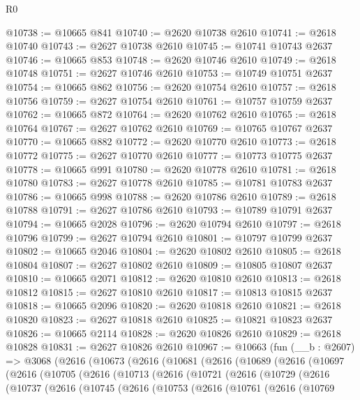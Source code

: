 \begin{lexlean}{R0}
\begin{coremodule}
@10738 := @10665 @841
@10740 := @2620 @10738 @2610
@10741 := @2618 @10740
@10743 := @2627 @10738 @2610
@10745 := @10741 @10743 @2637
@10746 := @10665 @853
@10748 := @2620 @10746 @2610
@10749 := @2618 @10748
@10751 := @2627 @10746 @2610
@10753 := @10749 @10751 @2637
@10754 := @10665 @862
@10756 := @2620 @10754 @2610
@10757 := @2618 @10756
@10759 := @2627 @10754 @2610
@10761 := @10757 @10759 @2637
@10762 := @10665 @872
@10764 := @2620 @10762 @2610
@10765 := @2618 @10764
@10767 := @2627 @10762 @2610
@10769 := @10765 @10767 @2637
@10770 := @10665 @882
@10772 := @2620 @10770 @2610
@10773 := @2618 @10772
@10775 := @2627 @10770 @2610
@10777 := @10773 @10775 @2637
@10778 := @10665 @991
@10780 := @2620 @10778 @2610
@10781 := @2618 @10780
@10783 := @2627 @10778 @2610
@10785 := @10781 @10783 @2637
@10786 := @10665 @998
@10788 := @2620 @10786 @2610
@10789 := @2618 @10788
@10791 := @2627 @10786 @2610
@10793 := @10789 @10791 @2637
@10794 := @10665 @2028
@10796 := @2620 @10794 @2610
@10797 := @2618 @10796
@10799 := @2627 @10794 @2610
@10801 := @10797 @10799 @2637
@10802 := @10665 @2046
@10804 := @2620 @10802 @2610
@10805 := @2618 @10804
@10807 := @2627 @10802 @2610
@10809 := @10805 @10807 @2637
@10810 := @10665 @2071
@10812 := @2620 @10810 @2610
@10813 := @2618 @10812
@10815 := @2627 @10810 @2610
@10817 := @10813 @10815 @2637
@10818 := @10665 @2096
@10820 := @2620 @10818 @2610
@10821 := @2618 @10820
@10823 := @2627 @10818 @2610
@10825 := @10821 @10823 @2637
@10826 := @10665 @2114
@10828 := @2620 @10826 @2610
@10829 := @2618 @10828
@10831 := @2627 @10826 @2610
@10967 := @10663
    (fun (__b : @2607) =>
    @3068
      (@2616
        (@10673
          (@2616
            (@10681
              (@2616
                (@10689
                  (@2616
                    (@10697
                      (@2616
                        (@10705
                          (@2616
                            (@10713
                              (@2616
                                (@10721
                                  (@2616
                                    (@10729
                                      (@2616
                                        (@10737
                                          (@2616
                                            (@10745
                                              (@2616
                                                (@10753
                                                  (@2616
                                                    (@10761
                                                      (@2616
                                                        (@10769

\end{coremodule}
\end{lexlean}
